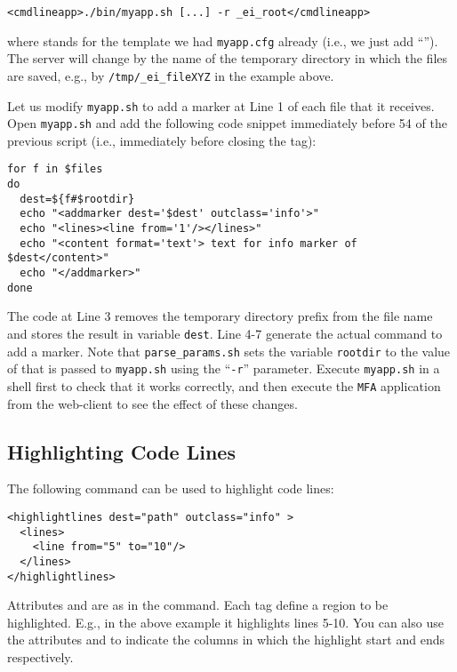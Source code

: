 \medskip
\begin{lstlisting}
<cmdlineapp>./bin/myapp.sh [...] -r _ei_root</cmdlineapp>
\end{lstlisting}

\medskip
\noindent
where \lst{[...]} stands for the template we had \texttt{myapp.cfg}
already (i.e., we just add ``'').
%
The server will change  by the name of the temporary
directory in which the files are saved, e.g., by
\texttt{/tmp/\_ei\_fileXYZ} in the example above.

Let us modify \texttt{myapp.sh} to add a marker at Line 1 of each file
that it receives. Open \texttt{myapp.sh} and add the following code
snippet immediately before 54 of the previous script (i.e.,
immediately before closing the  tag):

\medskip
\begin{lstlisting}[style=script]
for f in $files 
do
  dest=${f#$rootdir}
  echo "<addmarker dest='$dest' outclass='info'>"
  echo "<lines><line from='1'/></lines>"
  echo "<content format='text'> text for info marker of $dest</content>"
  echo "</addmarker>"
done
\end{lstlisting}

\medskip
\noindent
The code at Line 3 removes the temporary directory prefix from the file
name and stores the result in variable \texttt{dest}. Line 4-7
generate the actual command to add a marker.
%
Note that \texttt{parse\_params.sh} sets the variable \texttt{rootdir}
to the value of  that is passed to \texttt{myapp.sh}
using the ``\texttt{-r}'' parameter.
%
Execute \texttt{myapp.sh} in a shell first to check that it works
correctly, and then execute the \texttt{MFA} application from the
web-client to see the effect of these changes.

\subsection{Highlighting Code Lines}

The following command can be used to highlight code lines:

\medskip
\begin{lstlisting}
<highlightlines dest="path" outclass="info" > 
  <lines>
    <line from="5" to="10"/>
  </lines>
</highlightlines>
\end{lstlisting}

\medskip
\noindent
Attributes  and  are as in the 
command. Each  tag define a region to be highlighted. E.g.,
in the above example it highlights lines 5-10. You can also use the
attributes  and  to indicate the columns in
which the highlight start and ends respectively.

